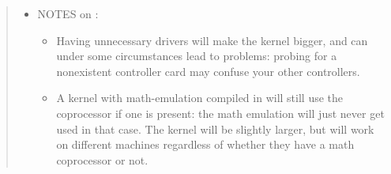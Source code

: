 \documentclass[a4paper,8pt,english]{sphinxmanual}
\def\PYGZgt{\char`\>}
\def\PYGZdl{\char`\$}
\def\PYGZsq{\char`\'}
\def\PYGZdq{\char`\"}
\renewcommand\PYGZsq{\textquotesingle}
\begin{document}
\begin{quote}
\begin{itemize}
\begin{Verbatim}[commandchars=\\\{\}]
\PYGZdq{}make allyesconfig\PYGZdq{}
                   Create a ./.config file by setting symbol
                   values to \PYGZsq{}y\PYGZsq{} as much as possible.

\PYGZdq{}make allmodconfig\PYGZdq{}
                   Create a ./.config file by setting symbol
                   values to \PYGZsq{}m\PYGZsq{} as much as possible.

\PYGZdq{}make allnoconfig\PYGZdq{} Create a ./.config file by setting symbol
                   values to \PYGZsq{}n\PYGZsq{} as much as possible.

\PYGZdq{}make randconfig\PYGZdq{}  Create a ./.config file by setting symbol
                   values to random values.

\PYGZdq{}make localmodconfig\PYGZdq{} Create a config based on current config and
                      loaded modules (lsmod). Disables any module
                      option that is not needed for the loaded modules.

                      To create a localmodconfig for another machine,
                      store the lsmod of that machine into a file
                      and pass it in as a LSMOD parameter.

              target\PYGZdl{} lsmod \PYGZgt{} /tmp/mylsmod
              target\PYGZdl{} scp /tmp/mylsmod host:/tmp

              host\PYGZdl{} make LSMOD=/tmp/mylsmod localmodconfig

                      The above also works when cross compiling.

\PYGZdq{}make localyesconfig\PYGZdq{} Similar to localmodconfig, except it will convert
                      all module options to built in (=y) options.
\end{Verbatim}

You can find more information on using the Linux kernel config tools
in Documentation/kbuild/kconfig.txt.

\item {} 
NOTES on :
\begin{itemize}
\item {} 
Having unnecessary drivers will make the kernel bigger, and can
under some circumstances lead to problems: probing for a
nonexistent controller card may confuse your other controllers.

\item {} 
A kernel with math-emulation compiled in will still use the
coprocessor if one is present: the math emulation will just
never get used in that case.  The kernel will be slightly larger,
but will work on different machines regardless of whether they
have a math coprocessor or not.


\end{itemize}
\end{itemize}
\end{quote}
\end{document}
